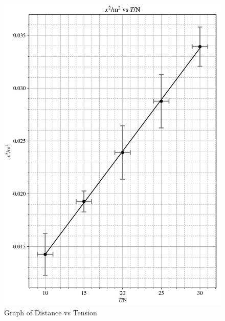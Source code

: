 \documentclass[12pt, a4paper]{article}
\begin{document}
\begin{figure}
    \centering
    \includegraphics[scale=0.9]{x2vsTgraph.png}
    \caption{Graph of Distance vs Tension}
    \label{fig:x2graph}
\end{figure}
\end{document}
